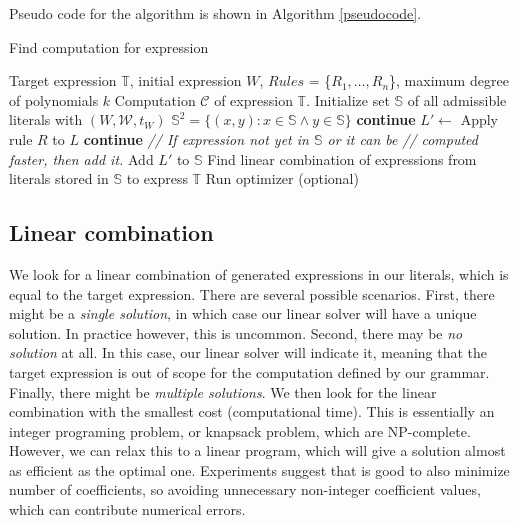 Pseudo code for the algorithm is shown in Algorithm \ref{pseudocode}.

\begin{algorithm}[t]
\caption{Find computation for expression}
\begin{algorithmic} 
\REQUIRE Target expression $\mathbb{T}$, initial expression $W$, $Rules$ = \{$R_1, \dots, R_n$\}, maximum degree of polynomials $k$
\ENSURE Computation $\mathcal{C}$ of expression $\mathbb{T}$.
\STATE Initialize set $\mathbb{S}$ of all admissible literals with $(W, \mathcal{W}, t_W)$
\STATE $\mathbb{S}^2 = \{ (x, y) : x \in \mathbb{S} \land y \in \mathbb{S}\}$ 
\STATE \textbf{continue}
\ENDIF
\STATE $L' \gets$ Apply rule $R$ to $L$
  \STATE \textbf{continue}
\ENDIF
\STATE \emph{// If expression not yet in $\mathbb{S}$ or it can be}
\STATE \emph{// computed faster, then add it.}
  \STATE Add $L'$ to $\mathbb{S}$
\ENDIF
\ENDFOR
\ENDFOR
\ENDWHILE
\STATE Find linear combination of expressions from literals stored in $\mathbb{S}$ to express $\mathbb{T}$
\STATE Run optimizer (optional)
\end{algorithmic}
\label{pseudocode}
\end{algorithm}


\subsection{Linear combination}
\label{sec:linear}
We look for a linear combination of generated expressions in our
literals, which is equal to the target expression. There are several
possible scenarios. First, there might be a \emph{single solution}, in
which case our linear solver will have a unique solution. In practice
however, this is uncommon. Second, there may be \emph{no solution} at
all.  In this case, our linear solver will indicate it, meaning that
the target expression is out of scope for the computation defined by
our grammar. Finally, there might be \emph{multiple solutions}. We
then look for the linear combination with the smallest cost
(computational time).  This is essentially an integer programing
problem, or knapsack problem, which are NP-complete. However, we can
relax this to a linear program, which will give a solution almost as
efficient as the optimal one.  Experiments suggest that is good to
also minimize number of coefficients, so avoiding unnecessary
non-integer coefficient values, which can contribute numerical errors.


